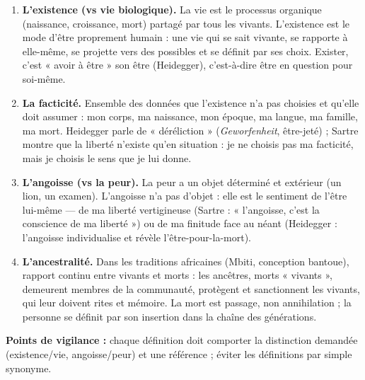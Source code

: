 \documentclass[11pt]{article}
\begin{document}
\begin{corrige}
\begin{enumerate}
\item \textbf{L'existence (vs vie biologique).} La vie est le processus organique (naissance, croissance, mort) partagé par tous les vivants. L'existence est le mode d'être proprement humain : une vie qui se sait vivante, se rapporte à elle-même, se projette vers des possibles et se définit par ses choix. Exister, c'est « avoir à être » son être (Heidegger), c'est-à-dire être en question pour soi-même.
\item \textbf{La facticité.} Ensemble des données que l'existence n'a pas choisies et qu'elle doit assumer : mon corps, ma naissance, mon époque, ma langue, ma famille, ma mort. Heidegger parle de « déréliction » (\emph{Geworfenheit}, être-jeté) ; Sartre montre que la liberté n'existe qu'en situation : je ne choisis pas ma facticité, mais je choisis le sens que je lui donne.
\item \textbf{L'angoisse (vs la peur).} La peur a un objet déterminé et extérieur (un lion, un examen). L'angoisse n'a pas d'objet : elle est le sentiment de l'être lui-même — de ma liberté vertigineuse (Sartre : « l'angoisse, c'est la conscience de ma liberté ») ou de ma finitude face au néant (Heidegger : l'angoisse individualise et révèle l'être-pour-la-mort).
\item \textbf{L'ancestralité.} Dans les traditions africaines (Mbiti, conception bantoue), rapport continu entre vivants et morts : les ancêtres, morts « vivants », demeurent membres de la communauté, protègent et sanctionnent les vivants, qui leur doivent rites et mémoire. La mort est passage, non annihilation ; la personne se définit par son insertion dans la chaîne des générations.
\end{enumerate}
\textbf{Points de vigilance :} chaque définition doit comporter la distinction demandée (existence/vie, angoisse/peur) et une référence ; éviter les définitions par simple synonyme.
\end{corrige}
\end{document}
